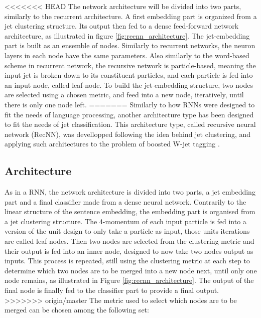 <<<<<<< HEAD
The network architecture will be divided into two parts, similarly to the recurrent architecture. A first embedding part is organized from a jet clustering structure. Its output then fed to a dense feed-forward network architecture, as illustrated in figure \ref{fig:recnn_architecture}.
The jet-embedding part is built as an ensemble of nodes. Similarly to recurrent networks, the neuron layers in each node have the same parameters. Also similarly to the word-based scheme in recurrent network, the recursive network is particle-based, meaning the input jet is broken down to its constituent particles, and each particle is fed into an input node, called leaf-node. To build the jet-embedding structure, two nodes are selected using a chosen metric, and feed into a new node, iteratively, until there is only one node left. 
=======
Similarly to how RNNs were designed to fit the needs of language processing, another architecture type has been designed to fit the needs of jet classification. This architecture type, called recursive neural network (RecNN), was devellopped following the idea behind jet clustering, and applying such architectures to the problem of boosted W-jet tagging \cite{Louppe:2017ipp}.

\subsection{Architecture}

As in a RNN, the network architecture is divided into two parts, a jet embedding part and a final classifier made from a dense neural network. Contrarily to the linear structure of the sentence embedding, the embedding part is organised from a jet clustering structure. The 4-momentum of each input particle is fed into a version of the unit design to only take a particle as input, those units iterations are called leaf nodes. Then two nodes are selected from the clustering metric and their output is fed into an inner node, designed to now take two nodes output as inputs. This process is repeated, still using the clustering metric at each step to determine which two nodes are to be merged into a new node next, until only one node remains, as illustrated in Figure \ref{fig:recnn_architecture}. The output of the final node is finally fed to the classifier part to provide a final output. 
>>>>>>> origin/master
The metric used to select which nodes are to be merged can be chosen among the following set:
    
